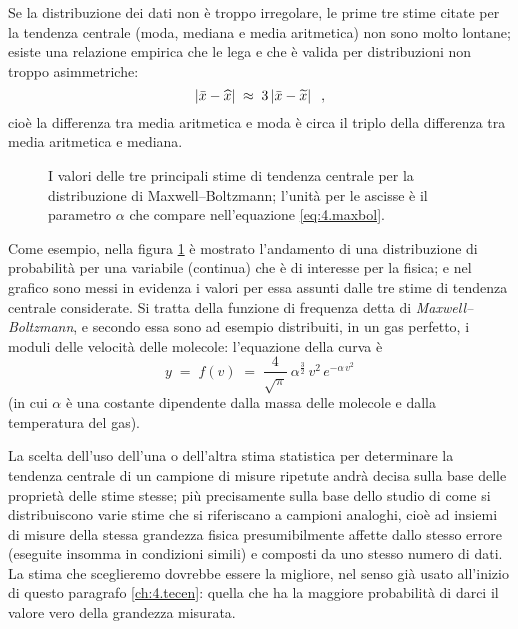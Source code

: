Se la distribuzione dei dati non \`e troppo irregolare, le
prime tre stime citate per la tendenza centrale (moda,
mediana e media aritmetica) non sono molto lontane; esiste
una relazione empirica che le lega e che \`e valida per
distribuzioni non troppo asimmetriche:
\begin{equation*}
  \left| \bar x - \widehat x \right| \; \approx \; 3
  \left| \bar x - \widetilde x \right| \;\; ,
\end{equation*}
cio\`e la differenza tra media aritmetica e moda \`e circa
il triplo della differenza tra media aritmetica e mediana.
\begin{figure}[htbp]
  \vspace*{2ex}
  \begin{center} {
    
  } \end{center}
  \caption[La distribuzione di Maxwell--Boltzmann]
  {I valori delle tre principali stime di tendenza centrale
    per la distribuzione di Maxwell--Boltzmann; l'unit\`a
    per le ascisse \`e il parametro $\alpha$ che compare
    nell'equazione \eqref{eq:4.maxbol}.}
  \label{fig:4.maxbol}
\end{figure}

Come esempio, nella figura \ref{fig:4.maxbol} \`e mostrato
l'andamento di una distribuzione di probabilit\`a per una
variabile (continua) che \`e di interesse per la fisica; e
nel grafico sono messi in evidenza i valori per essa assunti
dalle tre stime di tendenza centrale considerate.  Si tratta
della funzione di frequenza detta di
\emph{Maxwell--Boltzmann},%
e secondo essa sono ad esempio distribuiti, in un gas
perfetto, i moduli delle velocit\`a delle molecole:
l'equazione della curva \`e
\begin{equation} \label{eq:4.maxbol}
  y \; = \; f(v) \; = \; \frac{4}{\sqrt{\pi}} \:
  \alpha^\frac{3}{2} \, v^2 \, e^{-\alpha \, v^2}
\end{equation}
(in cui $\alpha$ \`e una costante dipendente dalla massa
delle molecole e dalla temperatura del gas).

La scelta dell'uso dell'una o dell'altra stima statistica
per determinare la tendenza centrale di un campione di
misure ripetute andr\`a decisa sulla base delle propriet\`a
delle stime stesse; pi\`u precisamente sulla base dello
studio di come si distribuiscono varie stime che si
riferiscano a campioni analoghi, cio\`e ad insiemi di misure
della stessa grandezza fisica presumibilmente affette dallo
stesso errore (eseguite  insomma in condizioni simili) e
composti da uno stesso numero di dati.  La stima che
sceglieremo dovrebbe essere la migliore, nel senso gi\`a
usato all'inizio di questo paragrafo \ref{ch:4.tecen}:
quella che ha la maggiore probabilit\`a di darci il valore
vero della grandezza misurata.

